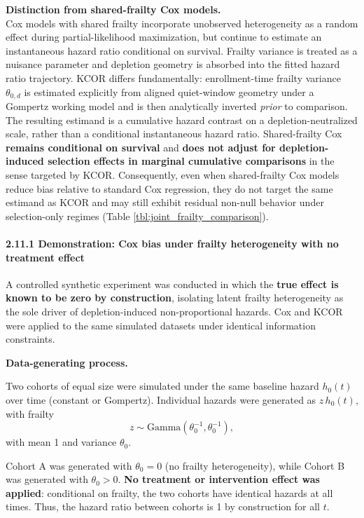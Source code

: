 \documentclass[
]{article}
\begin{document}
\textbf{Distinction from shared-frailty Cox models.}\\
Cox models with shared frailty incorporate unobserved heterogeneity as a
random effect during partial-likelihood maximization, but continue to
estimate an instantaneous hazard ratio conditional on survival. Frailty
variance is treated as a nuisance parameter and depletion geometry is
absorbed into the fitted hazard ratio trajectory. KCOR differs
fundamentally: enrollment-time frailty variance \(\theta_{0,d}\) is
estimated explicitly from aligned quiet-window geometry under a Gompertz
working model and is then analytically inverted \emph{prior} to
comparison. The resulting estimand is a cumulative hazard contrast on a
depletion-neutralized scale, rather than a conditional instantaneous
hazard ratio. Shared-frailty Cox \textbf{remains conditional on
survival} and \textbf{does not adjust for depletion-induced selection
effects in marginal cumulative comparisons} in the sense targeted by
KCOR. Consequently, even when shared-frailty Cox models reduce bias
relative to standard Cox regression, they do not target the same
estimand as KCOR and may still exhibit residual non-null behavior under
selection-only regimes (Table \ref{tbl:joint_frailty_comparison}).

\paragraph{2.11.1 Demonstration: Cox bias under frailty heterogeneity
with no treatment
effect}\label{demonstration-cox-bias-under-frailty-heterogeneity-with-no-treatment-effect}

A controlled synthetic experiment was conducted in which the
\textbf{true effect is known to be zero by construction}, isolating
latent frailty heterogeneity as the sole driver of depletion-induced
non-proportional hazards. Cox and KCOR were applied to the same
simulated datasets under identical information constraints.

\textbf{Data-generating process.}

Two cohorts of equal size were simulated under the same baseline hazard
\(h_0(t)\) over time (constant or Gompertz). Individual hazards were
generated as \(z\,h_0(t)\), with frailty \[
z \sim \text{Gamma}(\theta_0^{-1}, \theta_0^{-1}),
\] with mean 1 and variance \(\theta_0\).

Cohort A was generated with \(\theta_0 = 0\) (no frailty heterogeneity),
while Cohort B was generated with \(\theta_0 > 0\). \textbf{No treatment
or intervention effect was applied}: conditional on frailty, the two
cohorts have identical hazards at all times. Thus, the hazard ratio
between cohorts is 1 by construction for all \(t\).
\end{document}
